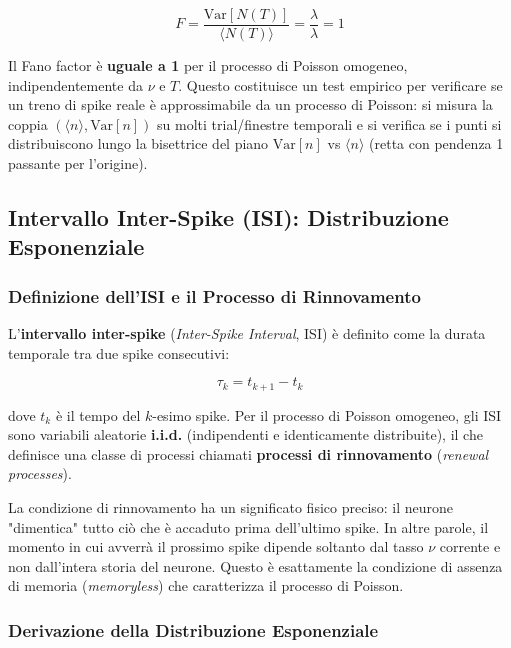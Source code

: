 \begin{equation}
F = \frac{\text{Var}[N(T)]}{\langle N(T) \rangle} = \frac{\lambda}{\lambda} = 1
\end{equation}

Il Fano factor è \textbf{uguale a 1} per il processo di Poisson omogeneo, indipendentemente da $\nu$ e $T$. Questo costituisce un test empirico per verificare se un treno di spike reale è approssimabile da un processo di Poisson: si misura la coppia $(\langle n \rangle, \text{Var}[n])$ su molti trial/finestre temporali e si verifica se i punti si distribuiscono lungo la bisettrice del piano $\text{Var}[n]$ vs $\langle n \rangle$ (retta con pendenza 1 passante per l'origine).



\subsection{Intervallo Inter-Spike (ISI): Distribuzione Esponenziale}

\subsubsection{Definizione dell'ISI e il Processo di Rinnovamento}

L'\textbf{intervallo inter-spike} (\textit{Inter-Spike Interval}, ISI) è definito come la durata temporale tra due spike consecutivi:

\begin{equation}
\tau_k = t_{k+1} - t_k
\end{equation}

dove $t_k$ è il tempo del $k$-esimo spike. Per il processo di Poisson omogeneo, gli ISI sono variabili aleatorie \textbf{i.i.d.} (indipendenti e identicamente distribuite), il che definisce una classe di processi chiamati \textbf{processi di rinnovamento} (\textit{renewal processes}).

La condizione di rinnovamento ha un significato fisico preciso: il neurone "dimentica" tutto ciò che è accaduto prima dell'ultimo spike. In altre parole, il momento in cui avverrà il prossimo spike dipende soltanto dal tasso $\nu$ corrente e non dall'intera storia del neurone. Questo è esattamente la condizione di assenza di memoria (\textit{memoryless}) che caratterizza il processo di Poisson.

\subsubsection{Derivazione della Distribuzione Esponenziale}

